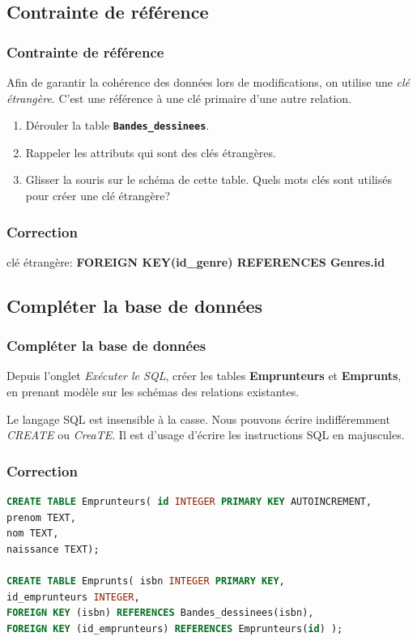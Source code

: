 \documentclass[svgnames,11pt]{beamer}
\begin{document}
\subsection{Contrainte de référence}
\begin{frame}
    \frametitle{Contrainte de référence}

    Afin de garantir la cohérence des données lors de modifications, on utilise une \emph{clé étrangère}. C'est une référence à une clé primaire d'une autre relation.
\begin{activite}
\begin{enumerate}
\item Dérouler la table \texttt{\textbf{Bandes\_dessinees}}.
\item Rappeler les attributs qui sont des clés étrangères.
\item Glisser la souris sur le schéma de cette table. Quels mots clés sont utilisés pour créer une clé étrangère?
\end{enumerate}
\end{activite}

\end{frame}
\begin{frame}
    \frametitle{Correction}

    clé étrangère: \textbf{FOREIGN KEY(id\_genre) REFERENCES Genres.id}

\end{frame}
\subsection{Compléter la base de données}
\begin{frame}
    \frametitle{Compléter la base de données}

    \begin{activite}
        Depuis l'onglet \emph{Exécuter le SQL}, créer les tables \textbf{Emprunteurs} et \textbf{Emprunts}, en prenant modèle sur les schémas des relations existantes.
        \end{activite}
        \begin{aretenir}[Remarque]
        Le langage SQL est insensible à la casse. Nous pouvons écrire indifféremment \emph{CREATE} ou \emph{CreaTE}. Il est d'usage d'écrire les instructions SQL en majuscules.
        \end{aretenir}    

\end{frame}
\begin{frame}[fragile]
    \frametitle{Correction}

    \begin{center}
    \begin{lstlisting}[language=sql , basicstyle=\ttfamily\small, xleftmargin=1em, xrightmargin=-1em]
CREATE TABLE Emprunteurs( id INTEGER PRIMARY KEY AUTOINCREMENT, 
prenom TEXT, 
nom TEXT, 
naissance TEXT);

CREATE TABLE Emprunts( isbn INTEGER PRIMARY KEY,
id_emprunteurs INTEGER, 
FOREIGN KEY (isbn) REFERENCES Bandes_dessinees(isbn), 
FOREIGN KEY (id_emprunteurs) REFERENCES Emprunteurs(id) );
\end{lstlisting}
    \end{center}

\end{frame}
\end{document}
